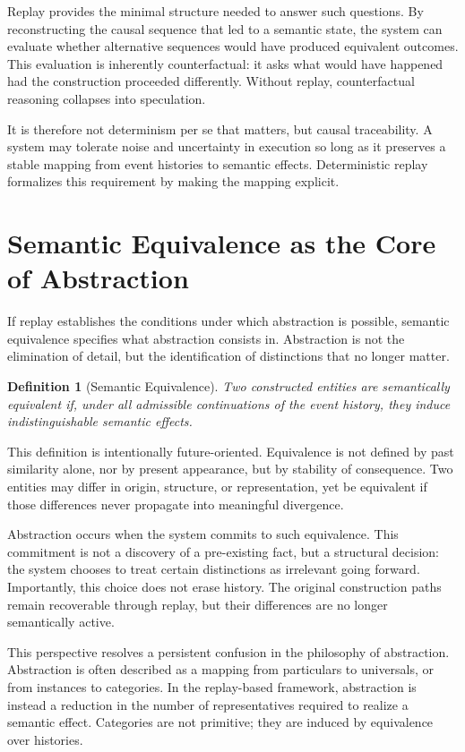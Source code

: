 \documentclass[11pt]{article}
\newtheorem{definition}{Definition}[section]
\begin{document}
Replay provides the minimal structure needed to answer such questions. By reconstructing the causal sequence that led to a semantic state, the system can evaluate whether alternative sequences would have produced equivalent outcomes. This evaluation is inherently counterfactual: it asks what would have happened had the construction proceeded differently. Without replay, counterfactual reasoning collapses into speculation.

It is therefore not determinism per se that matters, but causal traceability. A system may tolerate noise and uncertainty in execution so long as it preserves a stable mapping from event histories to semantic effects. Deterministic replay formalizes this requirement by making the mapping explicit.

\section{Semantic Equivalence as the Core of Abstraction}

If replay establishes the conditions under which abstraction is possible, semantic equivalence specifies what abstraction consists in. Abstraction is not the elimination of detail, but the identification of distinctions that no longer matter.

\begin{definition}[Semantic Equivalence]
Two constructed entities are semantically equivalent if, under all admissible continuations of the event history, they induce indistinguishable semantic effects.
\end{definition}

This definition is intentionally future-oriented. Equivalence is not defined by past similarity alone, nor by present appearance, but by stability of consequence. Two entities may differ in origin, structure, or representation, yet be equivalent if those differences never propagate into meaningful divergence.

Abstraction occurs when the system commits to such equivalence. This commitment is not a discovery of a pre-existing fact, but a structural decision: the system chooses to treat certain distinctions as irrelevant going forward. Importantly, this choice does not erase history. The original construction paths remain recoverable through replay, but their differences are no longer semantically active.

This perspective resolves a persistent confusion in the philosophy of abstraction. Abstraction is often described as a mapping from particulars to universals, or from instances to categories. In the replay-based framework, abstraction is instead a reduction in the number of representatives required to realize a semantic effect. Categories are not primitive; they are induced by equivalence over histories.
\end{document}
